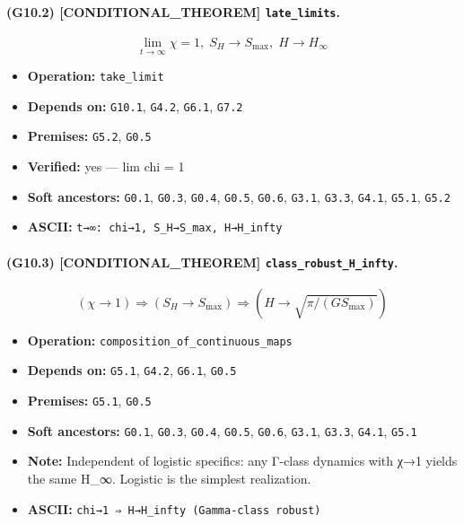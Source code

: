 \documentclass[11pt,a4paper]{article}
\theoremstyle{remark}\newtheorem*{caution}{Caution}
\newcommand{\tagbox}[1]{\textsc{[#1]}}
\begin{document}
\paragraph{(G10.2) \tagbox{CONDITIONAL\_THEOREM} \texttt{late\_limits}.}
\begin{equation}
\lim_{t\to\infty}\chi=1,\;S_H\to S_{\max},\;H\to H_\infty
\tag{G10.2}
\end{equation}
\begin{itemize}\setlength{\itemsep}{0.12em}
\item \textbf{Operation:} \texttt{take\_limit}
\item \textbf{Depends on:} \texttt{G10.1}, \texttt{G4.2}, \texttt{G6.1}, \texttt{G7.2}
\item \textbf{Premises:} \texttt{G5.2}, \texttt{G0.5}
\item \textbf{Verified:} yes --- lim chi = 1
\item \textbf{Soft ancestors:} \texttt{G0.1}, \texttt{G0.3}, \texttt{G0.4}, \texttt{G0.5}, \texttt{G0.6}, \texttt{G3.1}, \texttt{G3.3}, \texttt{G4.1}, \texttt{G5.1}, \texttt{G5.2}
\item \textbf{ASCII:} \texttt{t→∞: chi→1, S\_H→S\_max, H→H\_infty}
\end{itemize}
\paragraph{(G10.3) \tagbox{CONDITIONAL\_THEOREM} \texttt{class\_robust\_H\_infty}.}
\begin{equation}
(\chi\to 1)\Rightarrow(S_H\to S_{\max})\Rightarrow(H\to\sqrt{\pi/(GS_{\max})})
\tag{G10.3}
\end{equation}
\begin{itemize}\setlength{\itemsep}{0.12em}
\item \textbf{Operation:} \texttt{composition\_of\_continuous\_maps}
\item \textbf{Depends on:} \texttt{G5.1}, \texttt{G4.2}, \texttt{G6.1}, \texttt{G0.5}
\item \textbf{Premises:} \texttt{G5.1}, \texttt{G0.5}
\item \textbf{Soft ancestors:} \texttt{G0.1}, \texttt{G0.3}, \texttt{G0.4}, \texttt{G0.5}, \texttt{G0.6}, \texttt{G3.1}, \texttt{G3.3}, \texttt{G4.1}, \texttt{G5.1}
\item \textbf{Note:} Independent of logistic specifics: any Γ-class dynamics with χ→1 yields the same H\_∞. Logistic is the simplest realization.
\item \textbf{ASCII:} \texttt{chi→1 ⇒ H→H\_infty (Gamma-class robust)}
\end{itemize}
\end{document}
